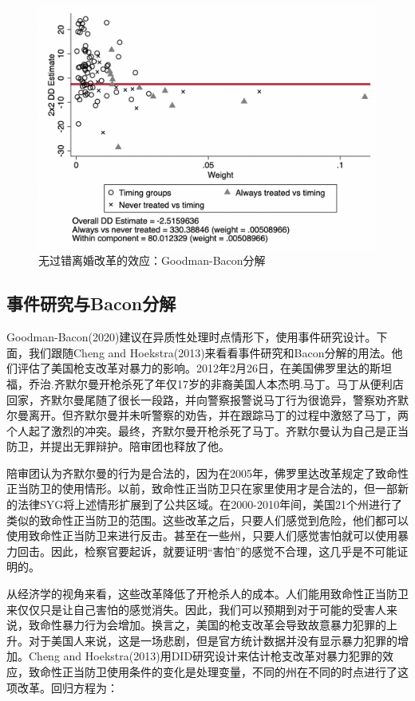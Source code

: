 \documentclass[cn,12pt,math=newtx,citestyle=gb7714-2015,bibstyle=gb7714-2015]{elegantbook}
\begin{document}
	
	\begin{figure}[tbph]
		\centering
		\includegraphics[width=1\linewidth]{GB_decomp_example}
		\caption{无过错离婚改革的效应：Goodman-Bacon分解}
		\label{fig:GB_decomp_example}
	\end{figure}
	
\subsection{事件研究与Bacon分解}


    Goodman-Bacon(2020)建议在异质性处理时点情形下，使用事件研究设计。下面，我们跟随Cheng and Hoekstra(2013)来看看事件研究和Bacon分解的用法。他们评估了美国枪支改革对暴力的影响。2012年2月26日，在美国佛罗里达的斯坦福，乔治.齐默尔曼开枪杀死了年仅17岁的非裔美国人本杰明.马丁。马丁从便利店回家，齐默尔曼尾随了很长一段路，并向警察报警说马丁行为很诡异，警察劝齐默尔曼离开。但齐默尔曼并未听警察的劝告，并在跟踪马丁的过程中激怒了马丁，两个人起了激烈的冲突。最终，齐默尔曼开枪杀死了马丁。齐默尔曼认为自己是正当防卫，并提出无罪辩护。陪审团也释放了他。
    
    陪审团认为齐默尔曼的行为是合法的，因为在2005年，佛罗里达改革规定了致命性正当防卫的使用情形。以前，致命性正当防卫只在家里使用才是合法的，但一部新的法律SYG将上述情形扩展到了公共区域。在2000-2010年间，美国21个州进行了类似的致命性正当防卫的范围。这些改革之后，只要人们感觉到危险，他们都可以使用致命性正当防卫来进行反击。甚至在一些州，只要人们感觉害怕就可以使用暴力回击。因此，检察官要起诉，就要证明“害怕”的感觉不合理，这几乎是不可能证明的。
    
    从经济学的视角来看，这些改革降低了开枪杀人的成本。人们能用致命性正当防卫来仅仅只是让自己害怕的感觉消失。因此，我们可以预期到对于可能的受害人来说，致命性暴力行为会增加。换言之，美国的枪支改革会导致故意暴力犯罪的上升。对于美国人来说，这是一场悲剧，但是官方统计数据并没有显示暴力犯罪的增加。Cheng and Hoekstra(2013)用DID研究设计来估计枪支改革对暴力犯罪的效应，致命性正当防卫使用条件的变化是处理变量，不同的州在不同的时点进行了这项改革。回归方程为：
    
\end{document}
